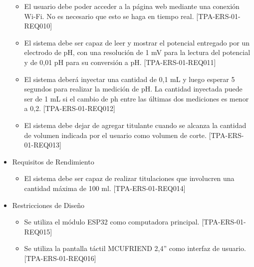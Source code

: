 \begin{itemize}
\begin{itemize}
	\item El usuario debe poder acceder a la página web mediante una conexión Wi-Fi. No es necesario que esto se haga en tiempo real. [TPA-ERS-01-REQ010]
	\item El sistema debe ser capaz de leer y mostrar el potencial entregado por un electrodo de pH, con una resolución de 1 mV para la lectura del potencial y de 0,01 pH para su conversión a pH. [TPA-ERS-01-REQ011]
	\item El sistema deberá inyectar una cantidad de 0,1 mL y luego esperar 5 segundos para realizar la medición de pH. La cantidad inyectada puede ser de 1 mL si el cambio de ph entre las últimas dos mediciones es menor a 0,2. [TPA-ERS-01-REQ012]
	 \item El sistema debe dejar de agregar titulante cuando se alcanza la cantidad de volumen indicada por el usuario como volumen de corte. [TPA-ERS-01-REQ013]

\end{itemize}

\item Requisitos de Rendimiento
	\begin{itemize}
	\item El sistema debe ser capaz de realizar titulaciones que involucren una cantidad máxima de 100 ml. [TPA-ERS-01-REQ014]
	\end{itemize}
	
\item Restricciones de Diseño
	\begin{itemize}
	\item Se utiliza el módulo ESP32 como computadora principal. [TPA-ERS-01-REQ015]
	\item Se utiliza la pantalla táctil MCUFRIEND 2,4'' como interfaz de usuario. [TPA-ERS-01-REQ016]
	\end{itemize}
\end{itemize}	


